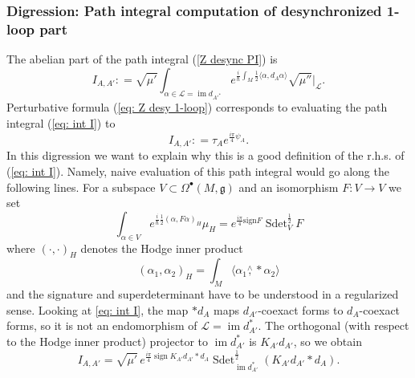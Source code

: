 \documentclass[11pt,a4paper]{amsart}
\theoremstyle{plain} %
\theoremstyle{definition}
\theoremstyle{remark}
\newcommand{\g}{\mathfrak{g}}
\newcommand{\sign}{\operatorname{sign}}
\newcommand{\im}{\operatorname{im}}
\newcommand{\sdet}{\operatorname{Sdet}}
\newcommand{\mr}{\mathrm}
\newcommand{\calL}{\mathcal{L}}
\begin{document}
{\subsubsection{Digression: Path integral computation of desynchronized 1-loop part}
The abelian part of the path integral (\ref{Z desync PI}) is
\begin{equation}
    I_{A,A'} \colon = \sqrt{\mu'} \int_{\alpha \in \calL = \im d_{A'^*} }e^{\frac{i}{\hbar}\int_M\frac12\langle \alpha, d_{A}\alpha\rangle}\sqrt{\mu''}\bigg|_\calL .
    \label{eq: int I}
\end{equation}
Perturbative formula (\ref{eq: Z desy 1-loop}) corresponds to evaluating the path integral (\ref{eq: int I}) to
\begin{equation}
    I_{A,A'}\colon= \tau_Ae^{\frac{i\pi}{4}\psi_A}.
\end{equation}
In this digression we want to explain why this is a good definition of the r.h.s. of (\ref{eq: int I}).
Namely, naive evaluation of this path integral would go along the following lines.
For a subspace $V \subset \Omega^\bullet(M,\g)$ and an isomorphism $F \colon V \to V$ we set 
    $$ \int_{\alpha \in V} e^{\frac{i}{\hbar}\frac12(\alpha, F\alpha)_H}\mu_H = e^{\frac{i\pi}{4}\mr{sign}F}\sdet_V^\frac12F$$  
    where $(\cdot,\cdot)_H$ denotes the Hodge inner product 
    $$(\alpha_1, \alpha_2)_H = \int_M \langle \alpha_1 \stackrel{\wedge}{,} * \alpha_2 \rangle $$
    and the signature and superdeterminant have to be understood in a regularized sense. Looking at \eqref{eq: int I}, the map $*d_{A}$ maps $d_{A'}$-coexact forms to $d_{A}$-coexact forms, so it is not an endomorphism of $\calL = \im d_{A'}^*$. The orthogonal (with respect to the Hodge inner product) projector to $\im d_{A'}^*$ is $K_{A'}d_{A'}$, so we obtain 
    \begin{equation} \label{eq: I def PI} I_{A,A'} = \sqrt{\mu'}\, e^{\frac{i\pi}{4}\sign K_{A'}d_{A'}*d_{A}}\sdet_{\im d_{A'}^*}^\frac12(K_{A'}d_{A'}*d_{A}).

\end{equation}}
\end{document}
